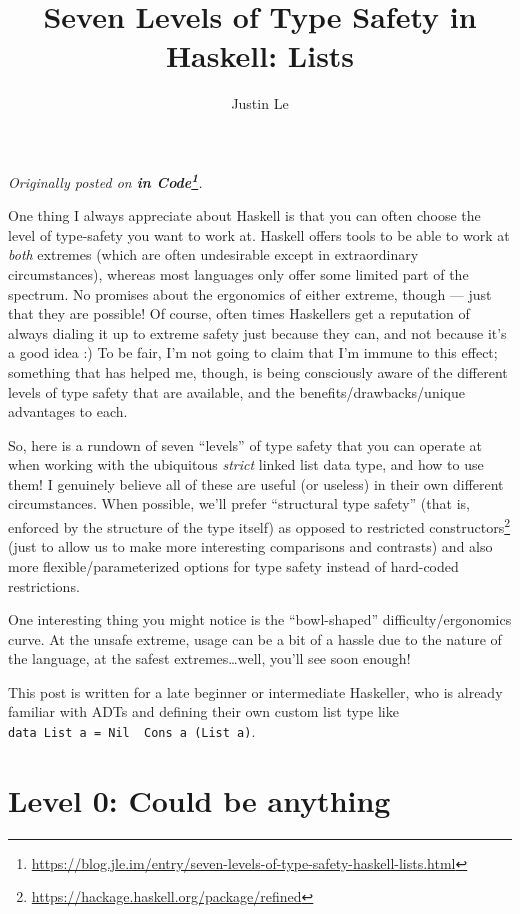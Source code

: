 \documentclass[]{article}
\title{Seven Levels of Type Safety in Haskell: Lists}
\author{Justin Le}
\renewcommand{\href}[2]{#2\footnote{\url{#1}}}
\begin{document}
\maketitle

\emph{Originally posted on
\textbf{\href{https://blog.jle.im/entry/seven-levels-of-type-safety-haskell-lists.html}{in
Code}}.}

One thing I always appreciate about Haskell is that you can often choose the
level of type-safety you want to work at. Haskell offers tools to be able to
work at \emph{both} extremes (which are often undesirable except in
extraordinary circumstances), whereas most languages only offer some limited
part of the spectrum. No promises about the ergonomics of either extreme, though
--- just that they are possible! Of course, often times Haskellers get a
reputation of always dialing it up to extreme safety just because they can, and
not because it's a good idea :) To be fair, I'm not going to claim that I'm
immune to this effect; something that has helped me, though, is being
consciously aware of the different levels of type safety that are available, and
the benefits/drawbacks/unique advantages to each.

So, here is a rundown of seven ``levels'' of type safety that you can operate at
when working with the ubiquitous \emph{strict} linked list data type, and how to
use them! I genuinely believe all of these are useful (or useless) in their own
different circumstances. When possible, we'll prefer ``structural type safety''
(that is, enforced by the structure of the type itself) as opposed to
\href{https://hackage.haskell.org/package/refined}{restricted constructors}
(just to allow us to make more interesting comparisons and contrasts) and also
more flexible/parameterized options for type safety instead of hard-coded
restrictions.

One interesting thing you might notice is the ``bowl-shaped''
difficulty/ergonomics curve. At the unsafe extreme, usage can be a bit of a
hassle due to the nature of the language, at the safest extremes\ldots well,
you'll see soon enough!

This post is written for a late beginner or intermediate Haskeller, who is
already familiar with ADTs and defining their own custom list type like
\texttt{data\ List\ a\ =\ Nil\ \textbar{}\ Cons\ a\ (List\ a)}.

\hypertarget{level-0-could-be-anything}{%
\section{Level 0: Could be anything}\label{level-0-could-be-anything}}
\end{document}
